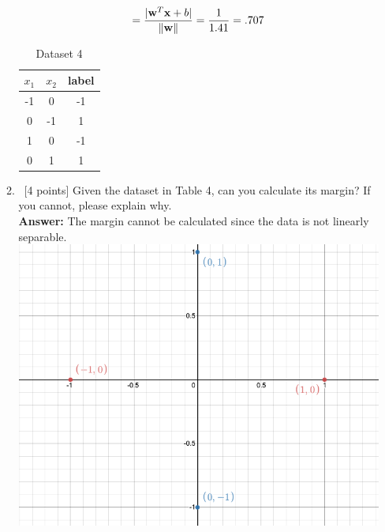 \documentclass[12pt, fullpage,letterpaper]{article}
\newcommand{\Answer}{{\\\textbf{Answer: }}}
\begin{document}
\begin{enumerate}
\begin{enumerate}
        	\[=\frac{\lvert{\bf w}^T{\bf x} + b\rvert}{\lVert{\bf w}\rVert} = \frac{1}{1.41} = .707\]
			\begin{table}[h]
				\centering
				\begin{tabular}{cc|c}
					$x_1$ & $x_2$ &  {label}\\ 
					\hline\hline
						-1 & 0 & -1 \\ \hline
					0 & -1 & 1 \\ \hline
					1 & 0 & -1 \\ \hline
					0 & 1 & 1 \\ \hline
				\end{tabular}
				\caption{Dataset 4}
			\end{table}
			\item~[4 points] Given the dataset in Table 4, can you calculate its margin? If you cannot, please explain why. 
			\Answer The margin cannot be calculated since the data is not linearly separable.\newline
			\includegraphics[scale=0.4]{2b.png}
		\end{enumerate}
	

\end{enumerate}
\end{document}
